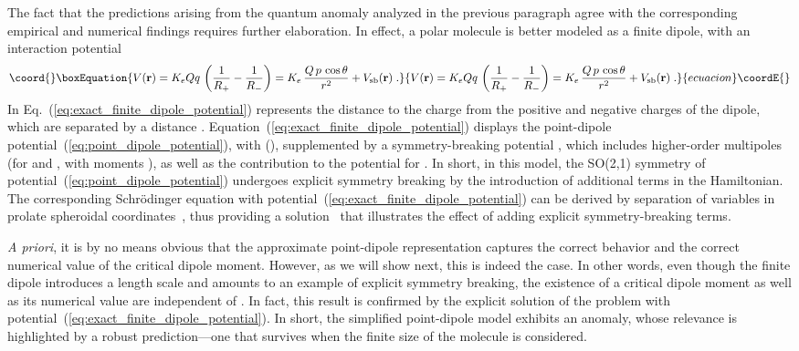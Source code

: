 \documentclass[a4paper,twocolumn,
showpacs,amssymb,aps,prl,superscriptaddress]{revtex4}%
\begin{document}
The fact that the predictions arising from the quantum anomaly
analyzed in the previous paragraph agree with the corresponding
empirical and numerical findings requires further elaboration. In
effect, a polar molecule is better modeled as a finite dipole,
with an interaction potential
\begin{equation}\coord{}\boxEquation{
V({\bf r}) = K_{e} Qq \, \left( \frac{1}{R_{+}} - \frac{1}{R_{-}}
\right) =
 K_{e} \, \frac{ Q \, p \, \cos \theta}{r^{2}}
 +
 V_{\rm sb}({\bf r})
\;  .
\label{eq:exact_finite_dipole_potential}
}{
V({\bf r}) = K_{e} Qq \, \left( \frac{1}{R_{+}} - \frac{1}{R_{-}}
\right) =
 K_{e} \, \frac{ Q \, p \, \cos \theta}{r^{2}}
 +
 V_{\rm sb}({\bf r})
\;  .
}{ecuacion}\coordE{}\end{equation} 
In Eq.~(\ref{eq:exact_finite_dipole_potential})
\coordHE{} represents the distance to the charge \coordHE{} from the positive
and negative charges of the dipole, which are separated by a distance \coordHE{}.
Equation~(\ref{eq:exact_finite_dipole_potential}) displays the
point-dipole potential~(\ref{eq:point_dipole_potential}), with
\coordHE{} (\coordHE{}), supplemented by a symmetry-breaking potential
\coordHE{}, which  includes higher-order multipoles
(for \coordHE{} and \coordHE{}, with moments \coordHE{}), as
well as the contribution to the potential for \coordHE{}. In short,
in this model, the SO(2,1) symmetry of
potential~(\ref{eq:point_dipole_potential}) undergoes explicit
symmetry breaking by the introduction of additional terms in the
Hamiltonian. The corresponding Schr\"{o}dinger equation with
potential~(\ref{eq:exact_finite_dipole_potential}) can be derived
by separation of variables in prolate spheroidal
coordinates~\cite{prolate}, thus providing a
solution~\cite{lev:67,bro:67,cra:67,finite_dipole} that
illustrates the effect of adding explicit symmetry-breaking terms.

{\em A priori\/}, it is by no means obvious that the approximate
point-dipole representation captures the correct behavior and the
correct numerical value of the critical dipole moment. However,
as we will show next, this is indeed the case.
 In other words, even though the finite dipole introduces a length scale \coordHE{}
 and amounts to an example of explicit symmetry breaking, the
existence of a critical dipole moment as well as its numerical
value are independent of \coordHE{}. In fact, this result is confirmed
by the explicit solution of the problem with
potential~(\ref{eq:exact_finite_dipole_potential}).
 In short, the simplified point-dipole model exhibits an
anomaly, whose relevance is highlighted by a robust
prediction---one that survives when the finite size of the
molecule is considered.
\end{document}
